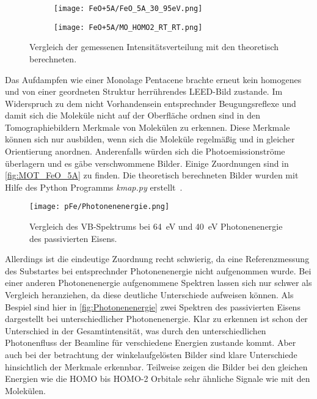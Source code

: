 \begin{figure}
\begin{subfigure}[t]{0.48\textwidth}
            \end{subfigure}
            \centering
            \begin{subfigure}[t]{0.48\textwidth}
                \centering
                \texttt{[image: FeO+5A/FeO\_5A\_30\_95eV.png]}
                \label{fig:MOT_FeO+5A_exp_4}
            \end{subfigure}
            \begin{subfigure}[t]{0.48\textwidth}
                \centering
                \texttt{[image: FeO+5A/MO\_HOMO2\_RT\_RT.png]}
                \label{fig:MOT_FeO+5A_theo_4}
            \end{subfigure}
            \caption{Vergleich der gemessenen Intensitätsverteilung mit den theoretisch berechneten.}
            \label{fig:MOT_FeO_5A}
        \end{figure}
        Das Aufdampfen wie einer Monolage Pentacene brachte erneut kein homogenes und von einer geordneten Struktur herrührendes LEED-Bild zustande.
        Im Widerspruch zu dem nicht Vorhandensein entsprechnder Beugungsreflexe und damit sich die Moleküle nicht auf der Oberfläche ordnen sind in den Tomographiebildern Merkmale von Molekülen zu erkennen.
        Diese Merkmale können sich nur ausbilden, wenn sich die Moleküle regelmäßig und in gleicher Orientierung anordnen.
        Anderenfalls würden sich die Photoemissionströme überlagern und es gäbe verschwommene Bilder.
        Einige Zuordnungen sind in \autoref{fig:MOT_FeO_5A} zu finden.
        Die theoretisch berechneten Bilder wurden mit Hilfe des Python Programms \textit{kmap.py} erstellt~\cite{brandstetter_kmappy_2021}.

        \begin{figure}
            \centering
            \texttt{[image: pFe/Photonenenergie.png]}
            \caption{Vergleich des VB-Spektrums bei \SI{64}{\electronvolt} und \SI{40}{\electronvolt} Photonenenergie des passivierten Eisens.}
            \label{fig:Photonenenergie}
        \end{figure}
        Allerdings ist die eindeutige Zuordnung recht schwierig, da eine Referenzmessung des Substartes bei entsprechnder Photonenenergie nicht aufgenommen wurde.
        Bei einer anderen Photonenenergie aufgenommene Spektren lassen sich nur schwer als Vergleich heranziehen, da diese deutliche Unterschiede aufweisen können.
        Als Bespiel sind hier in \autoref{fig:Photonenenergie} zwei Spektren des passivierten Eisens dargestellt bei unterschiedlicher Photonenenergie.
        Klar zu erkennen ist schon der Unterschied in der Gesamtintensität, was durch den unterschiedlichen Photonenfluss der Beamline für verschiedene Energien zustande kommt.
        Aber auch bei der betrachtung der winkelaufgelösten Bilder sind klare Unterschiede hinsichtlich der Merkmale erkennbar.
        Teilweise zeigen die Bilder bei den gleichen Energien wie die HOMO bis HOMO-2 Orbitale sehr ähnliche Signale wie mit den Molekülen.

